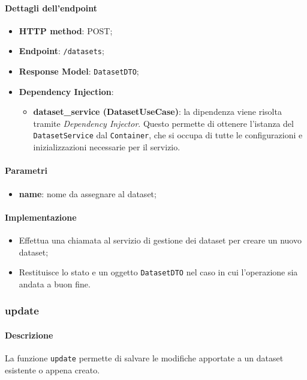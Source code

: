 \paragraph{Dettagli dell'endpoint}
\begin{itemize}
    \item \textbf{HTTP method}: POST;
    \item \textbf{Endpoint}: \texttt{/datasets};
    \item \textbf{Response Model}: \texttt{DatasetDTO};
    \item \textbf{Dependency Injection}: 
    \begin{itemize}
    \item \textbf{dataset\_service (DatasetUseCase)}: la dipendenza viene risolta tramite \textit{Dependency Injector}. Questo permette di ottenere l'istanza del \texttt{DatasetService} dal \texttt{Container}, che si occupa di tutte le configurazioni e inizializzazioni necessarie per il servizio.
    \end{itemize}
\end{itemize}

\paragraph{Parametri}
\begin{itemize}
    \item \textbf{name}: nome da assegnare al dataset;

\end{itemize}
\paragraph{Implementazione}
\begin{itemize}
    \item Effettua una chiamata al servizio di gestione dei dataset per creare un nuovo dataset;
    \item Restituisce lo stato e un oggetto \texttt{DatasetDTO} nel caso in cui l'operazione sia andata a buon fine.
\end{itemize}

\subsubsection{update}
\paragraph{Descrizione}
La funzione \texttt{update} permette di salvare le modifiche apportate a un dataset esistente o appena creato.
